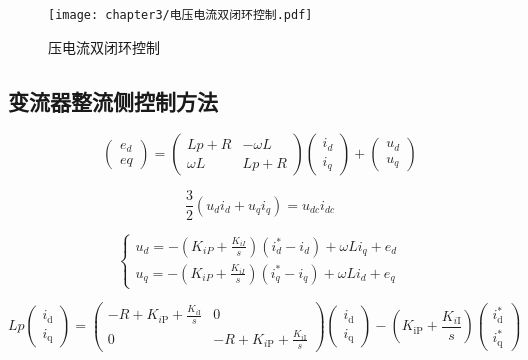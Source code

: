 \begin{figure}[!htp]
	\centering
	\texttt{[image: chapter3/电压电流双闭环控制.pdf]}
	\caption{压电流双闭环控制}
	\label{fig:压电流双闭环控制}
\end{figure}

\subsection{变流器整流侧控制方法}

\begin{equation}
	\begin{pmatrix}
		e_d \\ eq
	\end{pmatrix}=
	\begin{pmatrix}
		Lp+R & -\omega L \\ 
		\omega L & Lp+R 
	\end{pmatrix}
	\begin{pmatrix}
		i_d \\ i_q
	\end{pmatrix}+
	\begin{pmatrix}
		u_d \\ u_q
	\end{pmatrix}
\end{equation}

\begin{equation}
	\frac{3}{2}(u_di_d+u_qi_q)=u_{dc}i_{dc}
\end{equation}

\begin{equation}
	\begin{cases}
		u_d = - \left( K_{iP}+\frac{K_{iI}}{s} \right) (i_{d}^{*}-i_d) +\omega Li_q+e_d \\
		u_q = - \left( K_{iP}+\frac{K_{iI}}{s} \right) (i_{q}^{*}-i_q) +\omega Li_d+e_q	
	\end{cases}
\end{equation}

\begin{equation}
	L p\begin{pmatrix}
		i_{\mathrm{d}} \\
		i_{\mathrm{q}}
		\end{pmatrix}=
		\begin{pmatrix}
		-R+K_{i \mathrm{P}}+\frac{K_{i \mathrm{I}}}{s} & 0 \\
		0 & -R+K_{i \mathrm{P}}+\frac{K_{i \mathrm{I}}}{s}
		\end{pmatrix}
		\begin{pmatrix}
		i_{\mathrm{d}} \\
		i_{\mathrm{q}}
		\end{pmatrix}-
		\left(K_{\mathrm{iP}}+\frac{K_{i \mathrm{I}}}{s}\right)
		\begin{pmatrix}
		i_{\mathrm{d}}^{*} \\
		i_{\mathrm{q}}^{*}
		\end{pmatrix}
\end{equation}

